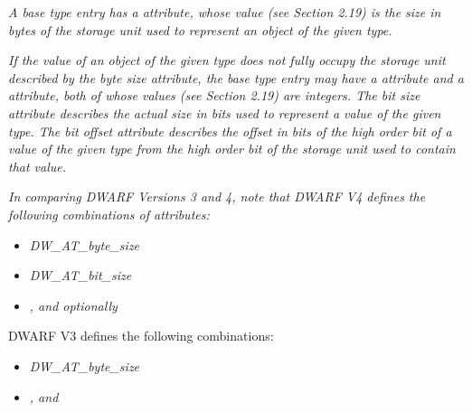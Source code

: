 \begin{myindentpara}{1cm}
\textit{A base type entry has a  attribute, whose value
(see Section 2.19) is the size in bytes of the storage unit
used to represent an object of the given type.}

\textit{If the value of an object of the given type does not fully
occupy the storage unit described by the byte size attribute,
the base type entry may have a  attribute and a
 attribute, both of whose values (see Section
2.19) are integers. The bit size attribute describes the actual
size in bits used to represent a value of the given type.
The bit offset attribute describes the offset in bits of the
high order bit of a value of the given type from the high
order bit of the storage unit used to contain that value.}
\end{myindentpara}

\textit{In comparing DWARF Versions 3 and 4, note that DWARF V4
defines the following combinations of attributes:}

\begin{itemize}
\item \textit{DW\-\_AT\-\_byte\-\_size}
\item \textit{DW\-\_AT\-\_bit\-\_size}
\item \textit{,  
and optionally }
\end{itemize}
DWARF V3 defines the following combinations:
\begin{itemize}
\item \textit{DW\-\_AT\-\_byte\-\_size}
\item \textit{,  and }
\end{itemize}


